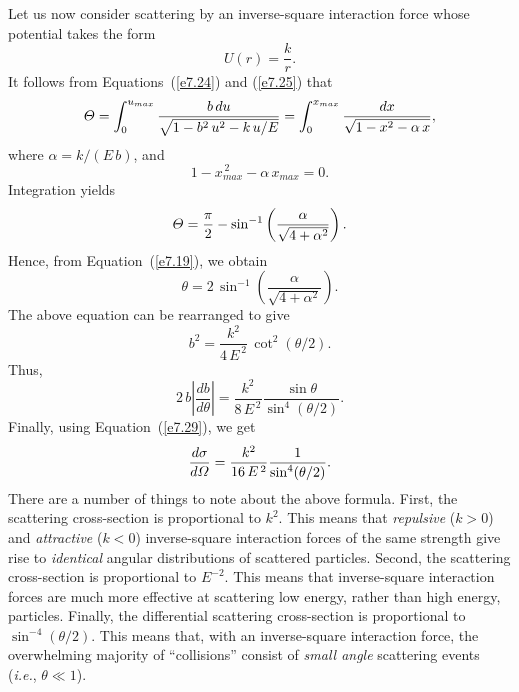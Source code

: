 Let us now consider scattering by an inverse-square interaction force
whose potential takes the form
\begin{equation}
U(r) = \frac{k}{r}.
\end{equation}
It follows from Equations~(\ref{e7.24}) and (\ref{e7.25}) that
\begin{equation}
{\mit\Theta} = \int_0^{u_{max}}\frac{b\,du}{\sqrt{1-b^2\,u^2
- k\,u/E}} = \int_0^{x_{max}}\frac{dx}{\sqrt{1-x^2- \alpha\,x}},
\end{equation}
where $\alpha = k/(E\,b)$, and
\begin{equation}
1 - x_{max}^{\,2} - \alpha\,x_{max}= 0.
\end{equation}
Integration yields
\begin{equation}
{\mit\Theta} = \frac{\pi}{2} - \sin^{-1}\left(\frac{\alpha}{\sqrt{4+\alpha^2}}\right).
\end{equation}
Hence, from Equation~(\ref{e7.19}), we obtain
\begin{equation}
\theta = 2\,\sin^{-1}\left(\frac{\alpha}{\sqrt{4+\alpha^2}}\right).
\end{equation}
The above equation can be rearranged to give
\begin{equation}
b^2 = \frac{k^2}{4\,E^{\,2}}\,\cot^2(\theta/2).
\end{equation}
Thus,
\begin{equation}
2\, b\left|\frac{db}{d\theta}\right| = \frac{k^2}{8\,E^{\,2}}\frac{\sin\theta}{\sin^4(\theta/2)}.
\end{equation}
Finally, using Equation~(\ref{e7.29}), we get
\begin{equation}\label{e7.45}
\frac{d\sigma}{d{\mit\Omega}} = \frac{k^2}{16\,E^{\,2}}\frac{1}{\sin^4(\theta/2)}.
\end{equation}
There are a number of things to note about the above formula. First, the
scattering cross-section is proportional to $k^2$. This means that
{\em repulsive}\/ ($k>0$) and {\em attractive}\/ ($k<0$) inverse-square interaction forces
of the same strength give rise to {\em identical}\/ angular distributions of scattered
particles. Second, the scattering cross-section is proportional to $E^{-2}$.
This means that inverse-square interaction forces are much
more effective at scattering low energy, rather than high energy, particles.
Finally, the differential scattering cross-section is proportional to
$\sin^{-4}(\theta/2)$. This means that, with an inverse-square
interaction force, the overwhelming majority of
``collisions''  consist of  {\em small angle}\/ scattering events ({\em i.e.}, $\theta\ll 1$).

